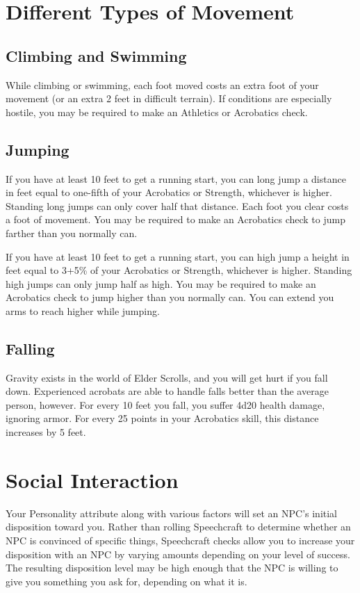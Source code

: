 \section{Different Types of Movement}

\subsection{Climbing and Swimming}
While climbing or swimming, each foot moved costs an extra foot of your movement (or an extra 2 feet in difficult terrain). If conditions are especially hostile, you may be required to make an Athletics or Acrobatics check.

\subsection{Jumping}
If you have at least 10 feet to get a running start, you can long jump a distance in feet equal to one-fifth of your Acrobatics or Strength, whichever is higher. Standing long jumps can only cover half that distance. Each foot you clear costs a foot of movement. You may be required to make an Acrobatics check to jump farther than you normally can.

If you have at least 10 feet to get a running start, you can high jump a height in feet equal to 3+5\% of your Acrobatics or Strength, whichever is higher. Standing high jumps can only jump half as high. You may be required to make an Acrobatics check to jump higher than you normally can. You can extend you arms to reach higher while jumping.

\subsection{Falling}
Gravity exists in the world of Elder Scrolls, and you will get hurt if you fall down. Experienced acrobats are able to handle falls better than the average person, however. For every 10 feet you fall, you suffer 4d20 health damage, ignoring armor. For every 25 points in your Acrobatics skill, this distance increases by 5 feet.

\section{Social Interaction}
Your Personality attribute along with various factors will set an NPC's initial disposition toward you. Rather than rolling Speechcraft to determine whether an NPC is convinced of specific things, Speechcraft checks allow you to increase your disposition with an NPC by varying amounts depending on your level of success. The resulting disposition level may be high enough that the NPC is willing to give you something you ask for, depending on what it is.

